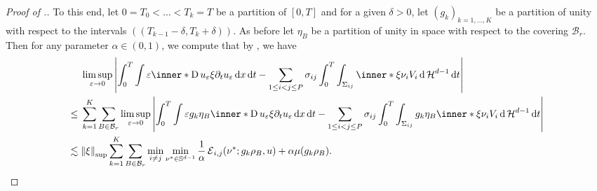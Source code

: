 \begin{proof}[Proof of .]
	To this end, let $ 0 = T_{ 0 } < \dotsc < T_{ k } = T $ be a partition of $ 
	[ 0 , T ] $ and for a given $ \delta > 0 $, let $ ( g_{ k } )_{ k = 1 , 
	\dotsc, K } $ be a partition of unity with respect to the intervals 
	$ \left( ( T_{ k - 1 } - \delta , T_{ k } + \delta ) \right) $. As before 
	let $ \eta_{ B } $ be a partition of unity in space with respect to the 
	covering $ \mathcal{ B }_{ r } $. Then for any parameter $ \alpha \in ( 0 , 
	1 ) $, we compute that by , we have
	\begin{align*}
		&
		\limsup_{ \varepsilon \to 0 }
			\abs{
				\int_{ 0 }^{ T }
					\int
						\varepsilon
						\inner*{ \diff u_{ \varepsilon } \xi }{ \partial_{ t } 
						u_{ \varepsilon } }
					\dd{ x }
				\dd{ t }
				-
				\sum_{ 1 \leq i < j \leq P }
					\sigma_{ i j }
					\int_{ 0 }^{ T }
						\int_{ \Sigma_{ i j } }
							\inner*{ \xi }{ \nu_{ i } }
							V_{ i }
						\dd{ \hm^{ d -1 } }
					\dd{ t }
			}
		\\
		\leq{} &
		\sum_{ k = 1 }^{ K }
			\sum_{ B \in \mathcal{ B }_{ r } }
				\limsup_{ \varepsilon \to 0 }
					\abs{
						\int_{ 0 }^{ T }
							\int
								\varepsilon
								g_{ k } \eta_{ B }
								\inner*{ \diff u_{ \varepsilon } \xi }{ 
								\partial_{ t } u_{ \varepsilon } }
							\dd{ x }
						\dd{ t }
						-
						\sum_{ 1 \leq i < j \leq P }
							\sigma_{ i j }
							\int_{ 0 }^{ T }
								\int_{ \Sigma_{ i j } }
									g_{ k } \eta_{ B }
									\inner*{\xi }{ \nu_{ i } }
									V_{ i }
								\dd{ \hm^{ d - 1 } }
							\dd{ t }					
					}
		\\
		\lesssim{} &
		\norm{ \xi }_{ \mathrm{sup} }
		\sum_{ k = 1 }^{ K }
			\sum_{ B \in \mathcal{ B }_{ r } }
				\min_{ i \neq j }
					\min_{ \nu^{ \ast } \in \mathbb{ S }^{ d - 1 } }
						\frac{ 1 }{ \alpha }
						\tilt_excess_{ i , j } ( \nu^{ \ast } ; g_{ k } \rho_{ 
						B } , u )
						+
						\alpha \mu ( g_{ k } \rho_{ B } ).
	\end{align*}
\end{proof}
 